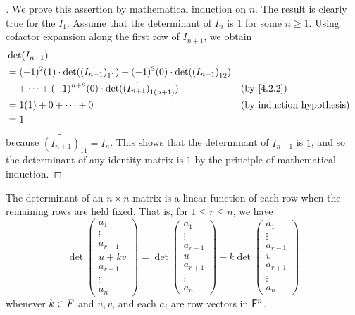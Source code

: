 \begin{proof}[]
  We prove this assertion by mathematical induction on \(n\).
  The result is clearly true for the \(I_1\).
  Assume that the determinant of \(I_n\) is \(1\) for some \(n \geq 1\).
  Using cofactor expansion along the first row of \(I_{n + 1}\), we obtain
  \begin{align*}
     & \det(I_{n + 1})                                                                                                                             \\
     & = (-1)^2 (1) \cdot \det(\tilde{(I_{n + 1})}_{1 1}) + (-1)^3 (0) \cdot \det(\tilde{(I_{n + 1})}_{1 2})                                       \\
     & \quad + \cdots  + (-1)^{n + 2} (0) \cdot \det(\tilde{(I_{n + 1})}_{1 (n + 1)})                        &  & \by{4.2.2}                       \\
     & = 1(1) + 0 + \cdots + 0                                                                               &  & \text{(by induction hypothesis)} \\
     & = 1
  \end{align*}
  because \(\tilde{(I_{n + 1})}_{1 1} = I_n\).
  This shows that the determinant of \(I_{n + 1}\) is \(1\), and so the determinant of any identity matrix is \(1\) by the principle of mathematical induction.
\end{proof}

\begin{thm}\label{4.3}
  The determinant of an \(n \times n\) matrix is a linear function of each row when the remaining rows are held fixed.
  That is, for \(1 \leq r \leq n\), we have
  \[
    \det\begin{pmatrix}
      a_1       \\
      \vdots    \\
      a_{r - 1} \\
      u + kv    \\
      a_{r + 1} \\
      \vdots    \\
      a_n
    \end{pmatrix} = \det\begin{pmatrix}
      a_1       \\
      \vdots    \\
      a_{r - 1} \\
      u         \\
      a_{r + 1} \\
      \vdots    \\
      a_n
    \end{pmatrix} + k \det\begin{pmatrix}
      a_1       \\
      \vdots    \\
      a_{r - 1} \\
      v         \\
      a_{r + 1} \\
      \vdots    \\
      a_n
    \end{pmatrix}
  \]
  whenever \(k \in \mathit{F}\) and \(u, v\), and each \(a_i\) are row vectors in \(\mathsf{F}^n\).
\end{thm}

